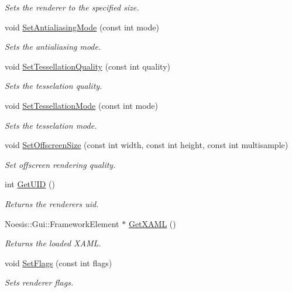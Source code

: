 \begin{DoxyCompactItemize}
\begin{DoxyCompactList}\small\item\em Sets the renderer to the specified size. \end{DoxyCompactList}\item 
void \hyperlink{class_u_i_renderer_a05d5fed9d98c02a150efeb8e6ea36812}{Set\-Antialiasing\-Mode} (const int mode)
\begin{DoxyCompactList}\small\item\em Sets the antialiasing mode. \end{DoxyCompactList}\item 
void \hyperlink{class_u_i_renderer_a77ab17ad59e589eb32d55699ea1ab1c6}{Set\-Tessellation\-Quality} (const int quality)
\begin{DoxyCompactList}\small\item\em Sets the tesselation quality. \end{DoxyCompactList}\item 
void \hyperlink{class_u_i_renderer_a54d4d9236175ecca2568dffa8f6a60e6}{Set\-Tessellation\-Mode} (const int mode)
\begin{DoxyCompactList}\small\item\em Sets the tesselation mode. \end{DoxyCompactList}\item 
void \hyperlink{class_u_i_renderer_ad8eacb018b912e5d7786ca6f1642b4ce}{Set\-Offscreen\-Size} (const int width, const int height, const int multisample)
\begin{DoxyCompactList}\small\item\em Set offscreen rendering quality. \end{DoxyCompactList}\item 
int \hyperlink{class_u_i_renderer_a45454e14885545c166a795d4a0884a38}{Get\-U\-I\-D} ()
\begin{DoxyCompactList}\small\item\em Returns the renderers uid. \end{DoxyCompactList}\item 
Noesis\-::\-Gui\-::\-Framework\-Element $\ast$ \hyperlink{class_u_i_renderer_a0989015bf54f7b6c624829c1fbf284d7}{Get\-X\-A\-M\-L} ()
\begin{DoxyCompactList}\small\item\em Returns the loaded X\-A\-M\-L. \end{DoxyCompactList}\item 
void \hyperlink{class_u_i_renderer_af9dca433a7bba7349412539760e9a6d6}{Set\-Flags} (const int flags)
\begin{DoxyCompactList}\small\item\em Sets renderer flags. \end{DoxyCompactList}\end{DoxyCompactItemize}
